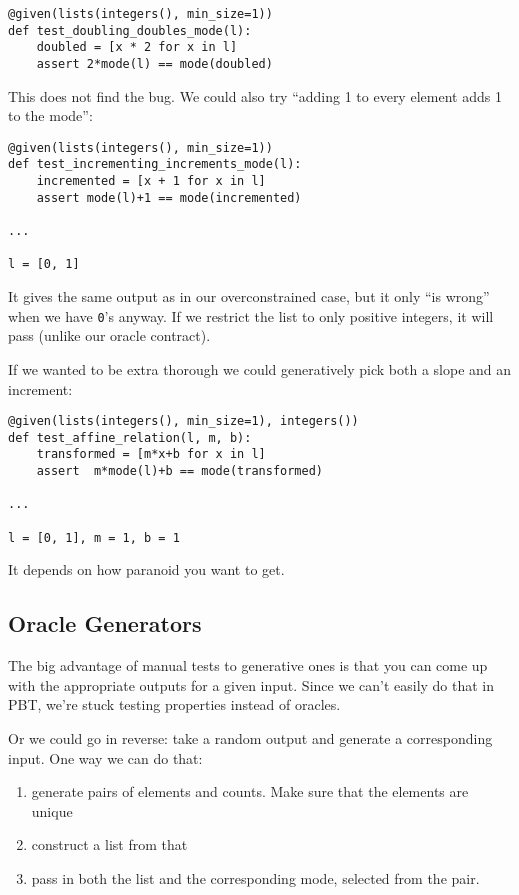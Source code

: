 \begin{verbatim}
@given(lists(integers(), min_size=1))
def test_doubling_doubles_mode(l):
    doubled = [x * 2 for x in l]
    assert 2*mode(l) == mode(doubled)
\end{verbatim}
This does not find the bug. We could also try ``adding 1 to every
element adds 1 to the mode'':

\begin{verbatim}
@given(lists(integers(), min_size=1))
def test_incrementing_increments_mode(l):
    incremented = [x + 1 for x in l]
    assert mode(l)+1 == mode(incremented)

...

l = [0, 1]
\end{verbatim}

It gives the same output as in our overconstrained case, but it only
``is wrong'' when we have \texttt{0}'s anyway. If we restrict the list to only
positive integers, it will pass (unlike our oracle contract).

If we wanted to be extra thorough we could generatively pick both a
slope and an increment:

\begin{verbatim}
@given(lists(integers(), min_size=1), integers())
def test_affine_relation(l, m, b):
    transformed = [m*x+b for x in l]
    assert  m*mode(l)+b == mode(transformed)

...

l = [0, 1], m = 1, b = 1
\end{verbatim}
It depends on how paranoid you want to get.

\subsection{Oracle Generators}
\label{oracle-generators}

The big advantage of manual tests to generative ones is that you can
come up with the appropriate outputs for a given input. Since we can't
easily do that in PBT, we're stuck testing properties instead of
oracles.

Or we could go in reverse: take a random output and generate a
corresponding input. One way we can do that:

\begin{enumerate}

\item
  generate pairs of elements and counts. Make sure that the elements are
  unique
\item
  construct a list from that
\item
  pass in both the list and the corresponding mode, selected from the
  pair.
\end{enumerate}

